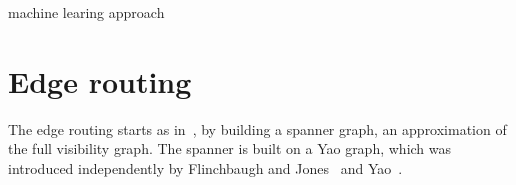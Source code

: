 \documentclass{gd-llncs}
\begin{document}
\cite{skewed}

\cite{circos}

\cite{gibson2013survey}

machine learing approach
\cite{kwon2017would}

\cite{lin2013interactive}

\cite{cosmograph}

\section*{Edge routing}
The edge routing starts as in~\cite{dwyer2010fast}, by building a spanner graph, an approximation of the full visibility graph. The spanner is built on a Yao graph, which was introduced independently by Flinchbaugh and Jones~\cite{flinchbaugh1981strong}  and Yao~\cite{yao1982constructing}.
\end{document}
